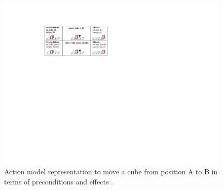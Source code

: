 \begin{figure}
	\centering
	\includegraphics[width=\linewidth]{Fig2.pdf}
	\caption{Action model representation to move a cube from position A to B in terms of preconditions and effects \cite{liang2017b}.}
	\label{fig:actionmodel-exp2}
\end{figure}	

